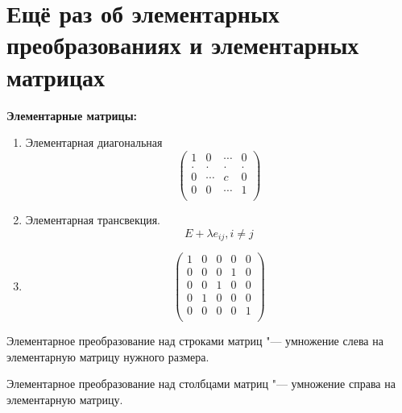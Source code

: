 ﻿\section{Ещё раз об элементарных преобразованиях и элементарных матрицах}
\textbf{Элементарные матрицы:}
\begin{enumerate}
\item 
Элементарная диагональная 
$$
\begin{pmatrix}
1&0&\cdots&0\\
.&.&.&.\\
0&\cdots&c&0\\
0&0&\cdots&1\\
\end{pmatrix}
$$
\item Элементарная трансвекция.
$$ E + \lambda e_{ij}, i \ne j$$
\item
$$ 
\begin{pmatrix}
1&0&0&0&0\\
0&0&0&1&0\\
0&0&1&0&0\\
0&1&0&0&0\\
0&0&0&0&1\\
\end{pmatrix}
$$
\end{enumerate}

Элементарное преобразование над строками матриц "--- 
умножение слева на элементарную матрицу нужного размера.

Элементарное преобразование над столбцами матриц "--- 
умножение справа на элементарную матрицу.


